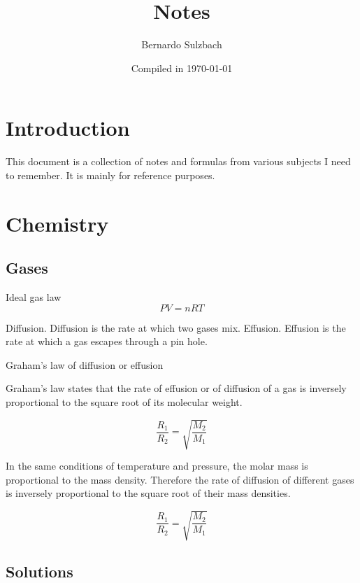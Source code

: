 \documentclass[oneside]{book} %
\title{\Huge Notes}
\author{Bernardo Sulzbach}
\date{Compiled in \today}
\theoremstyle{plain}
\begin{document}

\hypersetup{pageanchor=false} %
\begin{titlepage}
\maketitle
\end{titlepage}
\hypersetup{pageanchor=true}

\tableofcontents

\part{Introduction}
This document is a collection of notes and formulas from various subjects I
need to remember. It is mainly for reference purposes.

\part{Chemistry}

\chapter{Gases}

Ideal gas law
\[PV = nRT\]

Diffusion. Diffusion is the rate at which two gases mix.
Effusion. Effusion is the rate at which a gas escapes through a pin hole.

Graham's law of diffusion or effusion

Graham's law states that the rate of effusion or of diffusion of a gas is
inversely proportional to the square root of its molecular weight.

\[\frac{R_1}{R_2} = \sqrt{\frac{M_2}{M_1}}\]

In the same conditions of temperature and pressure, the molar mass is
proportional to the mass density. Therefore the rate of diffusion of different
gases is inversely proportional to the square root of their mass densities.

\[\frac{R_1}{R_2} = \sqrt{\frac{M_2}{M_1}}\]

\chapter{Solutions}
\end{document}
